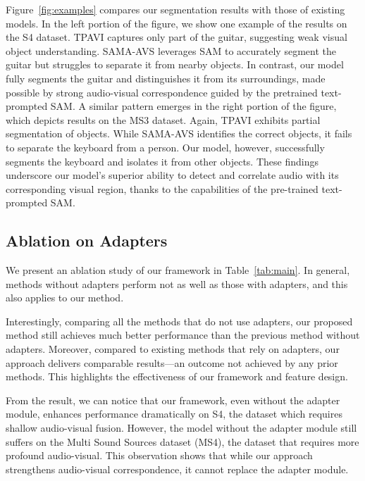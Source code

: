 Figure~\ref{fig:examples} compares our segmentation results with those of existing models. In the left portion of the figure, we show one example of the results on the S4 dataset. TPAVI \cite{zhou2022avs} captures only part of the guitar, suggesting weak visual object understanding. SAMA-AVS \cite{liu2024annotation} leverages SAM to accurately segment the guitar but struggles to separate it from nearby objects. In contrast, our model fully segments the guitar and distinguishes it from its surroundings, made possible by strong audio-visual correspondence guided by the pretrained text-prompted SAM. A similar pattern emerges in the right portion of the figure, which depicts results on the MS3 dataset. Again, TPAVI exhibits partial segmentation of objects. While SAMA-AVS identifies the correct objects, it fails to separate the keyboard from a person. Our model, however, successfully segments the keyboard and isolates it from other objects. These findings underscore our model’s superior ability to detect and correlate audio with its corresponding visual region, thanks to the capabilities of the pre-trained text-prompted SAM.

\subsection{Ablation on Adapters}
We present an ablation study of our framework in Table~\ref{tab:main}. 
In general, methods without adapters perform not as well as those with adapters, and this also applies to our method. 

Interestingly, comparing all the methods that do not use adapters, our proposed method still achieves much better performance than the previous method without adapters. Moreover, compared to existing methods that rely on adapters, our approach delivers comparable results—an outcome not achieved by any prior methods. This highlights the effectiveness of our framework and feature design. 




From the result, we can notice that our framework, even without the adapter module, enhances performance dramatically on S4, the dataset which requires shallow audio-visual fusion. However, the model without the adapter module still suffers on the Multi Sound Sources dataset (MS4), the dataset that requires more profound audio-visual. This observation shows that while our approach strengthens audio-visual correspondence, it cannot replace the adapter module. 

